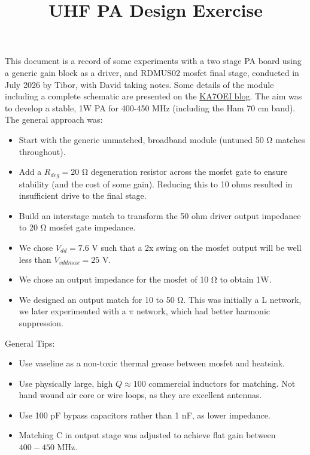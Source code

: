 \documentclass{article}
\begin{document}
\title{UHF PA Design Exercise}
\maketitle

This document is a record of some experiments with a two stage PA board using a generic gain block as a driver, and RDMUS02 mosfet final stage, conducted in July 2026 by Tibor, with David taking notes.  Some details of the module including a complete schematic are presented on the \href{https://ka7oei.blogspot.com/2023/04/exploring-1-930mhz-2w-rf-broadband.html}{KA7OEI blog}. The aim was to develop a stable, 1W PA for 400-450 MHz (including the Ham 70 \si{cm} band). The general approach was:
\begin{itemize}
\item Start with the generic unmatched, broadband module (untuned 50 \si{\ohm} matches throughout).
\item Add a $R_{deg}=20$ \si{\ohm} degeneration resistor across the mosfet gate to ensure stability (and the cost of some gain). Reducing this to 10 ohms resulted in insufficient drive to the final stage.
\item Build an interstage match to transform the 50 ohm driver output impedance to 20 \si{\ohm} mosfet gate impedance.
\item We chose $V_{dd}=7.6$ \si{V} such that a 2x swing on the mosfet output will be well less than $V_{vddmax}=25$ \si{V}.
\item We chose an output impedance for the mosfet of 10 \si{\ohm} to obtain 1W.
\item We designed an output match for 10 to 50 \si{\ohm}. This was initially a L network, we later experimented with a $\pi$ network, which had better harmonic suppression.
\end{itemize}

General Tips:
\begin{itemize}
\item Use vaseline as a non-toxic thermal grease between mosfet and heatsink.
\item Use physically large, high $Q\approx100$ commercial inductors for matching. Not hand wound air core or wire loops, as they are excellent antennas.
\item Use 100 \si{pF} bypass capacitors rather than 1 \si{nF}, as lower impedance. 
\item Matching C in output stage was adjusted to achieve flat gain between $400-450$ \si{MHz}.
\end{itemize}
\end{document}
